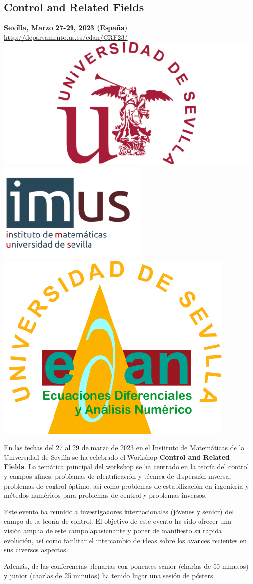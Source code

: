 \documentclass[twoside]{article}
\begin{document}
\subsection{Control and Related Fields}
\begin{center}
\textbf{Sevilla, Marzo 27-29, 2023 (España)}\\[.5em]
\url{ http://departamento.us.es/edan/CRF23/}\\[.5em]
\includegraphics[width=0.3\linewidth]{images/us}
\quad 
\includegraphics[width=0.25\linewidth]{images/imus2}
\quad 
\includegraphics[width=0.2\linewidth]{images/logoEDAN} 
\end{center}
 
 
 
 \bigskip
 
En las fechas del 27 al 29 de marzo de 2023 en el  Instituto de Matemáticas de la Universidad de Sevilla se ha celebrado el  Workshop \textbf{Control and Related Fields}. La temática principal del workshop se ha centrado en la teoría del control y campos afines: problemas de identificación y técnica de dispersión inversa, problemas de control óptimo, así como problemas de estabilización en ingeniería y métodos numéricos para problemas de control y problemas inversos.

Este evento ha reunido a investigadores internacionales (jóvenes y senior) del campo de la teoría de control. El objetivo de este evento ha sido ofrecer una visión amplia de este campo apasionante y poner de manifiesto su rápida evolución, así como facilitar el intercambio de ideas sobre los avances recientes en sus diversos aspectos.

Además, de las conferencias plenarias con ponentes senior (charlas de 50 minutos) y junior (charlas de 25 minutos) ha tenido lugar una sesión de pósters. 
\end{document}
